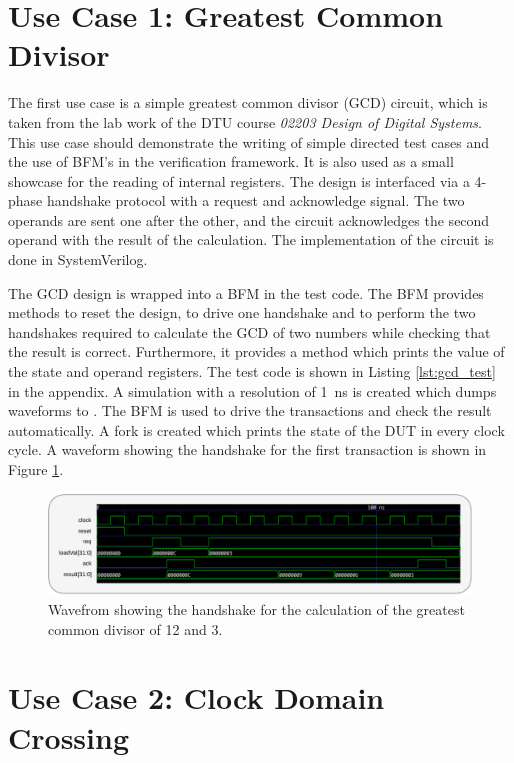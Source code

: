 \section{Use Case 1: Greatest Common Divisor} %

The first use case is a simple greatest common divisor (GCD) circuit, which is taken from the lab work of the DTU
course \textit{02203 Design of Digital Systems}. This use case should demonstrate the writing of simple directed test
cases and the use of BFM's in the verification framework. It is also used as a small showcase for the reading of
internal registers. The design is interfaced via a 4-phase handshake protocol with a request and acknowledge signal.
The two operands are sent one after the other, and the circuit acknowledges the second operand with the result of the
calculation. The implementation of the circuit is done in SystemVerilog.

The GCD design is wrapped into a BFM in the test code. The BFM provides methods to reset the design, to drive one
handshake and to perform the two handshakes required to calculate the GCD of two numbers while checking that the
result is correct. Furthermore, it provides a method which prints the value of the state and operand registers. The
test code is shown in Listing \ref{lst:gcd_test} in the appendix. A simulation with a resolution of \SI{1}{ns} is
created which dumps waveforms to . The BFM is used to drive the transactions and check the result
automatically. A fork is created which prints the state of the DUT in every clock cycle. A waveform showing the
handshake for the first transaction is shown in Figure \ref{fig:gcd_timing}.

\begin{figure}[t]
  \centering
  \includegraphics[width=\textwidth]{diagrams/gcd_timing.pdf}
  \caption{Wavefrom showing the handshake for the calculation of the greatest common divisor of 12 and 3.}
  \label{fig:gcd_timing}
\end{figure}

\section{Use Case 2: Clock Domain Crossing} %

